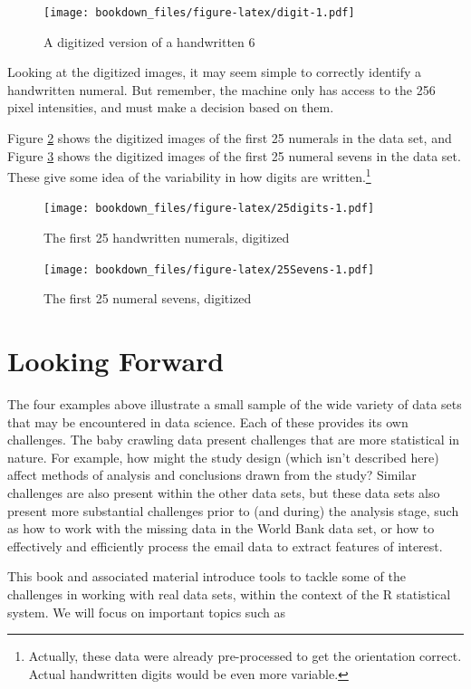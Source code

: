 \documentclass[]{krantz}
\begin{document}
\begin{figure}
\centering
\texttt{[image: bookdown\_files/figure-latex/digit-1.pdf]}
\caption{\label{fig:digit}A digitized version of a handwritten 6}
\end{figure}

Looking at the digitized images, it may seem simple to correctly
identify a handwritten numeral. But remember, the machine only has
access to the 256 pixel intensities, and must make a decision based on
them.

Figure \ref{fig:25digits} shows the digitized images of the first 25
numerals in the data set, and Figure \ref{fig:25Sevens} shows the
digitized images of the first 25 numeral sevens in the data set. These
give some idea of the variability in how digits are written.\footnote{Actually,
  these data were already pre-processed to get the orientation correct.
  Actual handwritten digits would be even more variable.}

\begin{figure}
\centering
\texttt{[image: bookdown\_files/figure-latex/25digits-1.pdf]}
\caption{\label{fig:25digits}The first 25 handwritten numerals, digitized}
\end{figure}

\begin{figure}
\centering
\texttt{[image: bookdown\_files/figure-latex/25Sevens-1.pdf]}
\caption{\label{fig:25Sevens}The first 25 numeral sevens, digitized}
\end{figure}

\section{Looking Forward}\label{looking-forward}

The four examples above illustrate a small sample of the wide variety of
data sets that may be encountered in data science. Each of these
provides its own challenges. The baby crawling data present challenges
that are more statistical in nature. For example, how might the study
design (which isn't described here) affect methods of analysis and
conclusions drawn from the study? Similar challenges are also present
within the other data sets, but these data sets also present more
substantial challenges prior to (and during) the analysis stage, such as
how to work with the missing data in the World Bank data set, or how to
effectively and efficiently process the email data to extract features
of interest.

This book and associated material introduce tools to tackle some of the
challenges in working with real data sets, within the context of the R
statistical system. We will focus on important topics such as
\end{document}
